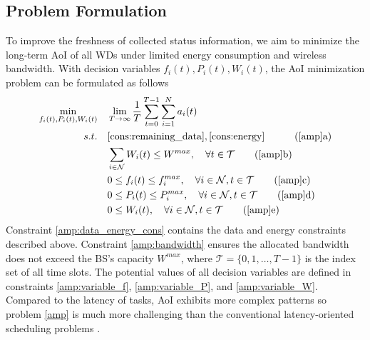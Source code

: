 \documentclass[lettersize, journal]{IEEEtran}
\begin{document}
\subsection{Problem Formulation}
To improve the freshness of collected status information,
we aim to minimize the long-term AoI of all WDs under limited energy consumption and wireless bandwidth.
With decision variables $f_i(t), P_i(t), W_i(t)$, the AoI minimization problem can be formulated as follows
\begin{align}
  \min_{f_i(t), P_i(t), W_i(t)}\quad & \lim_{T\to\infty} \frac{1}{T} \sum_{t=0}^{T-1} \sum_{i=1}^{N} a_i(t) \label{amp} \\
    s.t.\quad & \eqref{cons:remaining_data}, \eqref{cons:energy} \quad \tag{\ref{amp}{a}} \label{amp:data_energy_cons} \\
    & \sum_{i\in\mathcal{N}} W_i(t) \leq W^{max}, \quad \forall t\in\mathcal{T} \tag{\ref{amp}{b}} \label{amp:bandwidth} \\
    & 0 \leq f_i(t) \leq f^{max}_i, \quad \forall i\in\mathcal{N}, t\in\mathcal{T} \tag{\ref{amp}{c}} \label{amp:variable_f} \\
    & 0 \leq P_i(t) \leq P^{max}_i, \quad \forall i\in\mathcal{N}, t\in\mathcal{T} \tag{\ref{amp}{d}} \label{amp:variable_P} \\
    & 0 \leq W_i(t), \quad \forall i\in\mathcal{N}, t\in\mathcal{T} \tag{\ref{amp}{e}} \label{amp:variable_W}
\end{align}
Constraint \eqref{amp:data_energy_cons} contains the data and energy constraints described above.
Constraint \eqref{amp:bandwidth} ensures the allocated bandwidth does not exceed the BS's capacity $W^{max}$,
where $\mathcal{T} = \{ 0,1,\dots,T-1 \}$ is the index set of all time slots.
The potential values of all decision variables are defined in constraints \eqref{amp:variable_f}, \eqref{amp:variable_P}, and \eqref{amp:variable_W}.
Compared to the latency of tasks, AoI exhibits more complex patterns so problem \eqref{amp} is much more challenging than the
conventional latency-oriented scheduling problems \cite{kaul2012real}.
\end{document}

